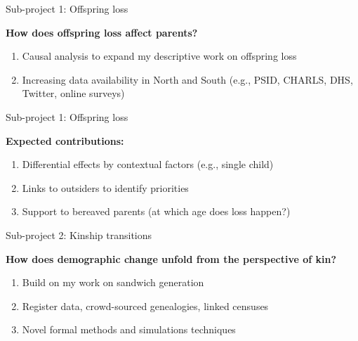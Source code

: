 \begin{frame}{Sub-project 1: Offspring loss}

\textbf{How does offspring loss affect parents?} 
\vspace{0.5cm}

 \begin{enumerate}
     \item Causal analysis to expand my descriptive work on offspring loss
     \item Increasing data availability in North and South (e.g., PSID, CHARLS, DHS, Twitter, online surveys)
 \end{enumerate}
\end{frame}


\begin{frame}{Sub-project 1: Offspring loss}

\textbf{Expected contributions:} 
\vspace{0.5cm}

     \begin{enumerate}
         \item Differential effects by contextual factors (e.g., single child)
         \item Links to outsiders to identify priorities
        \item  Support to bereaved parents (at which age does loss happen?)

     \end{enumerate}

\end{frame}


\begin{frame}{Sub-project 2: Kinship transitions}

\textbf{How does demographic change unfold from the perspective of kin?} 
\vspace{0.5cm}

 \begin{enumerate}
    \item Build on my work on sandwich generation
    \item Register data, crowd-sourced genealogies, linked censuses
    \item Novel formal methods and simulations techniques
 \end{enumerate}
 \end{frame}


